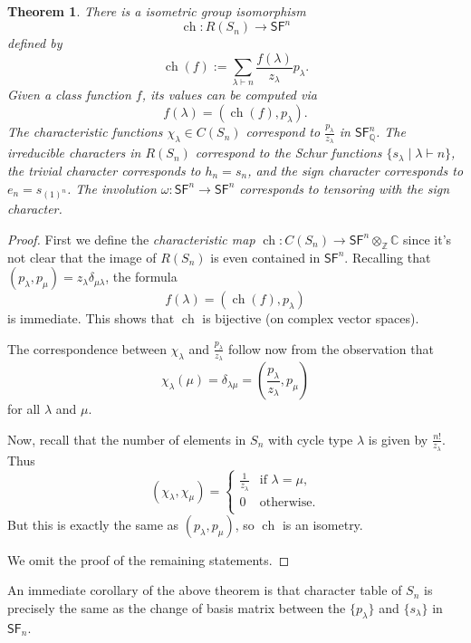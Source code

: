 \documentclass[12pt]{article}
\theoremstyle{plain}
\newtheorem{theorem}{Theorem}[section]
\theoremstyle{definition}
\theoremstyle{remark}
\numberwithin{equation}{section}
\begin{document}
\begin{theorem}
There is a isometric group isomorphism
\[
\operatorname{ch} : R(S_n) \to \mathsf{SF}^n
\]
defined by
\[
\operatorname{ch}(f) :=
\sum_{\lambda \vdash n} \frac{f(\lambda)}{z_\lambda} p_{\lambda}.
\]
Given a class function $f$, its values can be computed via
\[
f(\lambda) = ( \operatorname{ch}(f), p_\lambda ).
\]
The characteristic functions $\chi_\lambda \in C(S_n)$
correspond to $\frac{p_{\lambda}}{z_\lambda}$ in
$\mathsf{SF}^n_{\mathbb{Q}}$.
The irreducible characters in $R(S_n)$ correspond to the Schur
functions $\{ s_\lambda \mid \lambda \vdash n \}$,
the trivial character corresponds to $h_n=s_n$, and
the sign character corresponds to $e_n=s_{(1)^n}$.
The involution $\omega : \mathsf{SF}^n \to \mathsf{SF}^n$
corresponds to tensoring with the sign character.
\end{theorem}

\begin{proof}
First we define the \emph{characteristic map}
$\operatorname{ch} : C(S_n) \to
\mathsf{SF}^n \otimes_{\mathbb{Z}} \mathbb{C}$
since it's not clear that the image of $R(S_n)$ is even
contained in $\mathsf{SF}^n$.
Recalling that $(p_\lambda,p_\mu)=z_\lambda \delta_{\mu \lambda}$,
the formula
\[
f(\lambda) = ( \operatorname{ch}(f), p_\lambda )
\]
is immediate.  This shows that $\operatorname{ch}$ is bijective
(on complex vector spaces).

The correspondence between
$\chi_\lambda$ and $\frac{p_{\lambda}}{z_\lambda}$
follow now from the observation that
\[
\chi_\lambda(\mu) = \delta_{\lambda \mu} =
\left(\frac{p_{\lambda}}{z_\lambda}, p_\mu\right)
\]
for all $\lambda$ and $\mu$.

Now, recall that the number of elements in $S_n$ with cycle type
$\lambda$ is given by $\frac{n!}{z_\lambda}$.  Thus
\[
(\chi_\lambda, \chi_\mu) =
\begin{cases}
\frac{1}{z_\lambda} & \textrm{if $\lambda=\mu$,}\\
0 & \textrm{otherwise.}\\
\end{cases}
\]
But this is exactly the same as $(p_\lambda,p_\mu)$,
so $\operatorname{ch}$ is an isometry.

We omit the proof of the remaining statements. 
\end{proof}

An immediate corollary of the above theorem is that
character table of $S_n$ is precisely the same
as the change of basis matrix between the $\{ p_\lambda \}$
and $\{ s_\lambda \}$ in $\mathsf{SF}_n$.
\end{document}
